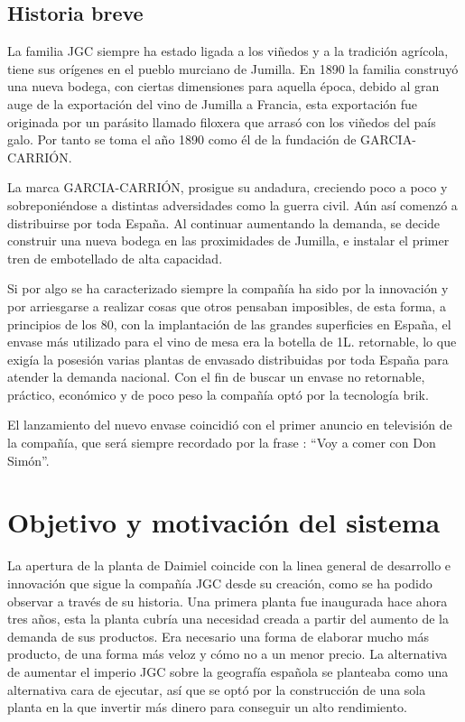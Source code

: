 \documentclass[11pt,a4paper,spanish,twoside]{report}
\begin{document}
\section{Historia breve}
La familia JGC siempre ha estado ligada a los viñedos y a la tradición
agrícola, tiene sus orígenes en el pueblo murciano de Jumilla. En 1890 la 
familia construyó una nueva bodega, con ciertas dimensiones para aquella
época, debido al gran auge de la exportación del vino de Jumilla a
Francia, esta exportación fue originada por un parásito llamado filoxera que
arrasó con los viñedos del país galo. Por tanto se toma el año 1890 como él de la
fundación de GARCIA-CARRIÓN.

La marca GARCIA-CARRIÓN, prosigue su andadura, creciendo poco a poco y
sobreponiéndose a distintas adversidades como la guerra civil. Aún así
comenzó a distribuirse por toda España. Al continuar aumentando la demanda, 
se decide construir una nueva bodega en las proximidades de Jumilla, e
instalar el primer tren de embotellado de alta capacidad.
  
 
Si por algo se ha caracterizado siempre la compañía ha sido por la innovación
y por arriesgarse a realizar cosas que otros pensaban imposibles, de
esta forma, a principios de los 80, con la implantación de las grandes
superficies en España, el envase más utilizado para el vino de mesa era la
botella de 1L. retornable, lo que exigía la posesión varias plantas de
envasado distribuidas por toda España para atender la demanda nacional. Con
el fin de buscar un envase no retornable, práctico, económico y de poco peso
la compañía optó por la tecnología brik.

El lanzamiento del nuevo envase coincidió con el primer anuncio en televisión
de la compañía, que será siempre recordado por la frase : ``Voy a comer con
Don Simón''.

\chapter{Objetivo y motivación del sistema}
La apertura de la planta de Daimiel coincide con la linea general de
desarrollo e innovación que sigue la compañía JGC desde su creación, como
se ha podido observar a través de su historia. Una primera planta fue
inaugurada hace ahora tres años, esta la planta cubría una necesidad creada
a partir del aumento de la demanda de sus productos. Era necesario una forma
de elaborar mucho más producto, de una forma más veloz y cómo no a un menor
precio. La alternativa de aumentar el imperio JGC sobre la geografía española
se planteaba como una alternativa cara de ejecutar, así que se optó por la
construcción de una sola planta en la que invertir más dinero para conseguir
un alto rendimiento.
\end{document}
